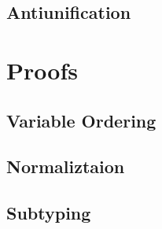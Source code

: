 \documentclass[a4,natbib=false]{article}
\begin{document}
\subsection{Antiunification}
\ottdefnsAU

\section{Proofs}

\subsection{Variable Ordering}




\subsection{Normaliztaion}



\subsection{Subtyping}


\end{document}

